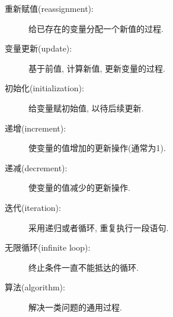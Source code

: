 \documentclass[10pt]{book}
\begin{document}
\begin{description}

\item[重新赋值(reassignment):] 给已存在的变量分配一个新值的过程. 

\item[变量更新(update):] 基于前值, 计算新值, 更新变量的过程. 

\item[初始化(initialization):] 给变量赋初始值, 以待后续更新. 

\item[递增(increment):] 使变量的值增加的更新操作(通常为1). 


\item[递减(decrement):] 使变量的值减少的更新操作. 

\item[迭代(iteration):] 采用递归或者循环, 重复执行一段语句. 

\item[无限循环(infinite loop):] 终止条件一直不能抵达的循环. 

\item[算法(algorithm):]  解决一类问题的通用过程. 

\end{description}

\end{document}
